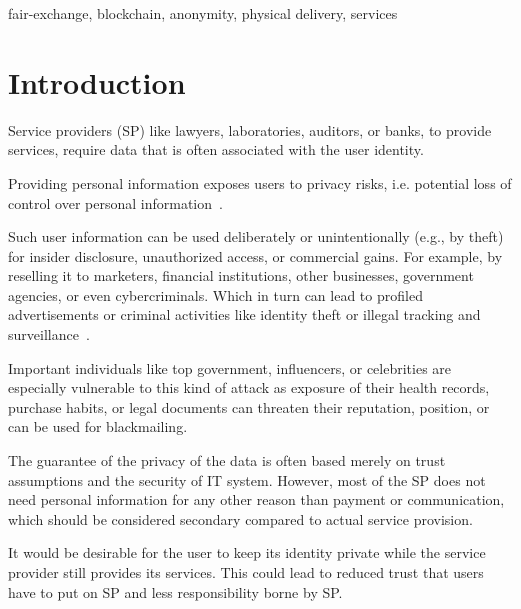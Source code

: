 \documentclass{ieeeaccess}
\begin{document}
\begin{keywords}
fair-exchange, blockchain, anonymity,  physical delivery, services
\end{keywords}

\titlepgskip=-15pt

\maketitle
\section{Introduction}
Service providers (SP) like lawyers, laboratories, auditors, or banks,
to provide services, require data that is often associated with the user
identity.

Providing personal information exposes users to privacy risks,
i.e. potential loss of control over personal
information~\cite{smith2011information}.

Such user information can be used deliberately or unintentionally
(e.g., by theft) for insider disclosure, unauthorized access, or
commercial gains. For example, by reselling it to marketers, financial institutions, other businesses, government agencies, or even cybercriminals. Which in turn can lead to profiled advertisements or criminal activities like identity theft or illegal tracking and surveillance~\cite{smith2011information}.

Important individuals like top government, influencers, or celebrities are especially vulnerable to this kind of attack as exposure of their health records, purchase habits, or legal documents can threaten their reputation, position, or can be used for blackmailing.

The guarantee of the privacy of the data is often based merely on trust assumptions and the security of IT system. However, most of the SP does not need personal information for any other reason than payment or communication, which should be considered secondary compared to actual service provision.

It would be desirable for the user to keep its identity private while the service provider still provides its services. This could lead to reduced trust that users have to put on SP and less responsibility borne by SP.
\end{document}
